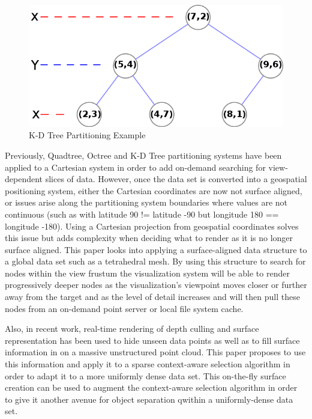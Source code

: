 \begin{figure}[htb]
\begin{center}
\includegraphics[width=.5\linewidth]{images/kdtree_layers.png}
\end{center}
\caption{K-D Tree Partitioning Example \cite{13_tree_0001.svg}}
\label{fig:kdtreelayers}
\end{figure}

Previously, Quadtree, Octree \cite{3_wenzel2014out} and K-D Tree partitioning
systems have been applied to a Cartesian system in order to add on-demand
searching for view-dependent slices of data. However, once the data set is
converted into a geospatial positioning system, either the Cartesian coordinates
are now not surface aligned, or issues arise along the partitioning system
boundaries where values are not continuous (such as with latitude 90 != latitude
-90 but longitude 180 == longitude -180). Using a Cartesian projection from
geospatial coordinates solves this issue but adds complexity when deciding what
to render as it is no longer surface aligned. This paper looks into applying a
surface-aligned data structure to a global data set such as a tetrahedral mesh.
By using this structure to search for nodes within the view frustum the
visualization system will be able to render progressively deeper nodes as the
visualization's viewpoint moves closer or further away from the target and as
the level of detail increases and will then pull these nodes from an on-demand
point server or local file system cache.

Also, in recent work, real-time rendering of depth culling and surface
representation \cite{1_VAST:VAST11:105-112} has been used to hide unseen data
points as well as to fill surface information in on a massive unstructured point
cloud. This paper proposes to use this information and apply it to a sparse
context-aware selection algorithm \cite{2_yu:hal-01178051} in order to adapt it
to a more uniformly dense data set. This on-the-fly surface creation can be used
to augment the context-aware selection algorithm in order to give it another
avenue for object separation qwithin a uniformly-dense data set.
